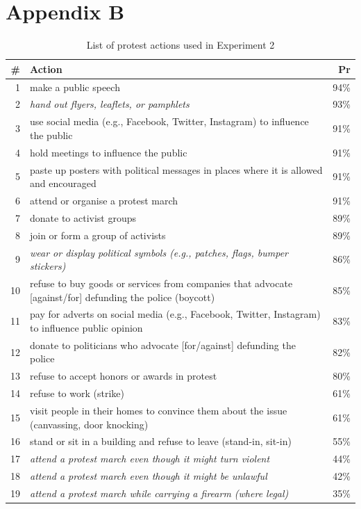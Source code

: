 \documentclass[twocolumn, 11pt, letterpaper]{article}
\begin{document}
\begin{table}

\section{Appendix B}

\caption{List of protest actions used in Experiment 2}
\small
\begin{tabularx}{\linewidth}{rXr}
\addlinespace
\toprule
\# & Action & Pr\\
\midrule
1 & make a public speech & 94\%\\
2 & \textit{hand out flyers, leaflets, or pamphlets} & 93\%\\
3 & use social media (e.g., Facebook, Twitter, Instagram) to influence the public & 91\%\\
4 & hold meetings to influence the public & 91\%\\
5 & paste up posters with political messages in places where it is allowed and encouraged & 91\%\\
6 & attend or organise a protest march & 91\%\\
7 & donate to activist groups & 89\%\\
8 & join or form a group of activists & 89\%\\
9 & \textit{wear or display political symbols (e.g., patches, flags, bumper stickers)} & 86\%\\
10 & refuse to buy goods or services from companies that advocate [against/for] defunding the police (boycott) & 85\%\\
11 & pay for adverts on social media (e.g., Facebook, Twitter, Instagram) to influence public opinion & 83\%\\
12 & donate to politicians who advocate [for/against] defunding the police & 82\%\\
13 & refuse to accept honors or awards in protest & 80\%\\
14 & refuse to work (strike) & 61\%\\
15 & visit people in their homes to convince them about the issue (canvassing, door knocking) & 61\%\\
16 & stand or sit in a building and refuse to leave (stand-in, sit-in) & 55\%\\
17 & \textit{attend a protest march even though it might turn violent} & 44\%\\
18 & \textit{attend a protest march even though it might be unlawful} & 42\%\\
19 & \textit{attend a protest march while carrying a firearm (where legal)} & 35\%\\

\end{tabularx}
\end{table}
\end{document}
